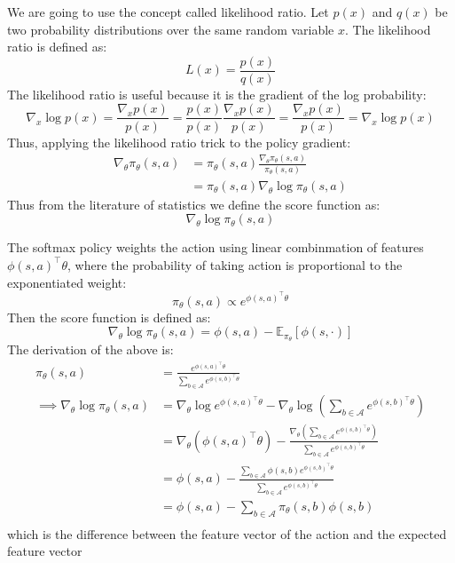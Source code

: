 We are going to use the concept called likelihood ratio. Let \(p(x)\) and \(q(x)\) be two probability
distributions over the same random variable \(x\). The likelihood ratio is defined as:
\[
    L(x) = \frac{p(x)}{q(x)}
\]
The likelihood ratio is useful because it is the gradient of the log probability:
\[
    \nabla_x \log p(x) = \frac{\nabla_x p(x)}{p(x)} = \frac{p(x)}{p(x)} \frac{\nabla_x p(x)}{p(x)} = \frac{\nabla_x p(x)}{p(x)} = \nabla_x \log p(x)
\]
Thus, applying the likelihood ratio trick to the policy gradient:
\[
    \begin{aligned}
        \nabla _\theta  \pi _\theta (s,a) &= \pi _\theta (s,a) \frac{\nabla _\theta  \pi _\theta (s,a)}
        {\pi _\theta (s,a)} \\&= \pi _\theta (s,a) \nabla _\theta \log \pi _\theta (s,a)
    \end{aligned}
\]
Thus from the literature of statistics we define the score function as:
\[
    \nabla _\theta \log \pi _\theta (s,a)
\]
\begin{example}
    The softmax policy weights the action using linear combinmation of features \(\phi (s,a)^{\top} \theta\),
    where the probability of taking action is proportional to the exponentiated weight:
    \[
        \pi _\theta (s,a) \propto e^{\phi (s,a)^{\top} \theta}
    \]
    Then the score function is defined as:
    \[
        \nabla _\theta \log \pi _\theta (s,a) = \phi (s,a) - \mathbb{E}_{\pi_\theta}[\phi (s,\cdot)]  
    \]
    The derivation of the above is:
    \[
        \begin{aligned}
            \pi_\theta(s,a) &= \frac{e^{\phi(s,a)^{\top} \theta}}{\sum\limits_{b \in \mathcal{A}} 
            e^{\phi(s,b)^{\top} \theta}} \\
            \implies \nabla_\theta \log \pi_\theta(s,a) &= \nabla_\theta \log e^{\phi(s,a)^{\top} \theta} -
            \nabla_\theta \log\left(   
             \sum\limits_{b \in \mathcal{A}} e^{\phi(s,b)^{\top} \theta} \right)\\
                &= \nabla _\theta \left( 
                    \phi(s,a)^{\top} \theta 
                 \right) - \frac{\nabla_\theta \left( 
                    \sum\limits_{b \in \mathcal{A}} e^{\phi(s,b)^{\top} \theta}
                    \right)}{\sum\limits_{b \in \mathcal{A}} e^{\phi(s,b)^{\top} \theta}} \\
                &= \phi(s,a) - \frac{\sum\limits_{b \in \mathcal{A}} \phi(s,b) e^{\phi(s,b)^{\top} \theta}}
                {\sum\limits_{b \in \mathcal{A}} e^{\phi(s,b)^{\top} \theta}} \\
                &= \phi(s,a) - \sum\limits_{b \in \mathcal{A}} \pi_\theta(s,b) \phi(s,b) \\
        \end{aligned}
    \]
    which is the difference between the feature vector of the action and the expected feature vector
\end{example}


